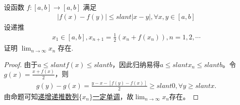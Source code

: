\documentclass[../../main.tex]{subfiles}
\begin{document}
\begin{example}
设函数 $f:[a,b] \to [a,b]$ 满足
\begin{align*}
|f(x) - f(y)| \leqslant slant |x - y|, \forall x,y \in [a,b]
\end{align*}
设递推
\begin{align*}
x_1 \in [a,b], x_{n+1} = \frac{1}{2}(x_n + f(x_n)), n = 1,2,\cdots
\end{align*}
证明 $\lim_{n \to \infty} x_n$ 存在.
\end{example}
\begin{proof}
由于$a \leqslant slant f(x) \leqslant slant b$，因此归纳易得$a \leqslant slant x_n \leqslant slant b$。令$g(x) = \frac{x + f(x)}{2}$，则
\begin{align*}
g(y) - g(x) = \frac{y - x - [f(y) - f(x)]}{2} \geqslant slant 0, \forall y \geqslant slant x.
\end{align*}
由命题可知\hyperref[proposition:递增函数递推数列]{递增递推数列$\{ x_n \}$一定单调}，故$\lim_{n \to \infty} x_n$存在。
\end{proof}
\end{document}
